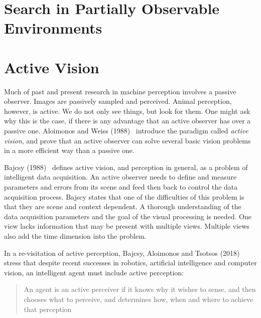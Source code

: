 
\section{Search in Partially Observable Environments}

\section{Active Vision}
\label{sec:activevision}


Much of past and present research in machine perception involves a passive observer.
Images are passively sampled and perceived.
Animal perception, however, is active.
We do not only see things, but look for them.
One might ask why this is the case, if there is any advantage that an active observer has over a passive one.
Aloimonos and Weiss (1988)~\cite{aloimonos_active_1988} introduce the paradigm called \textit{active vision}, and prove that an active observer can solve several basic vision problems in a more efficient way than a passive one.

Bajcsy (1988)~\cite{bajcsy_1988} defines active vision, and perception in general, as a problem of intelligent data acquisition.
An active observer needs to define and measure parameters and errors from its scene and feed then back to control the data acquisition process.
Bajscy states that one of the difficulties of this problem is that they are scene and context dependent.
A thorough understanding of the data acquisition parameters and the goal of the visual processing is needed.
One view lacks information that may be present with multiple views.
Multiple views also add the time dimension into the problem.

In a re-visitation of active perception, Bajcsy, Aloimonos and Tsotsos (2018)~\cite{bajcsy_aloimonos_tsotsos_2018} stress that despite recent successes in robotics, artificial intelligence and computer vision, an intelligent agent must include active perception:

\begin{quote}
    An agent is an active perceiver if it knows why it wishes to sense, and then chooses what to perceive, and determines how, when and where to achieve that perception
\end{quote}~\cite{bajcsy_aloimonos_tsotsos_2018}

